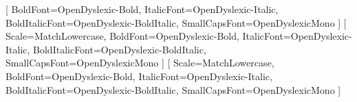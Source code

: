 \usepackage[french]{babel}
\usepackage[utf8x]{inputenc} %
\usepackage{xspace} %

\usepackage{ifxetex}
\ifxetex
    \usepackage{fontspec}
    \setmainfont{OpenDyslexic}
    [
      BoldFont=OpenDyslexic-Bold,
      ItalicFont=OpenDyslexic-Italic,
      BoldItalicFont=OpenDyslexic-BoldItalic,
      SmallCapsFont=OpenDyslexicMono
    ]
    \setsansfont{OpenDyslexic}[
      Scale=MatchLowercase,
      BoldFont=OpenDyslexic-Bold,
      ItalicFont=OpenDyslexic-Italic,
      BoldItalicFont=OpenDyslexic-BoldItalic,
      SmallCapsFont=OpenDyslexicMono
    ]
    \setmonofont{OpenDyslexicMono}[
      Scale=MatchLowercase,
      BoldFont=OpenDyslexic-Bold,
      ItalicFont=OpenDyslexic-Italic,
      BoldItalicFont=OpenDyslexic-BoldItalic,
      SmallCapsFont=OpenDyslexicMono
    ]
\else
    \usepackage[T1]{fontenc}
\fi

\usepackage{amsmath, amsfonts} %
\usepackage{latexsym}

\usepackage{amsthm}

\usepackage{authoraftertitle}

\usepackage{datetime}

\usepackage{hyperref}
\usepackage{bookmark}

\usepackage{graphicx}
\usepackage{subcaption} %

\usepackage{tabularx}
\usepackage{multirow} %
\usepackage{multicol} %
\usepackage[table]{xcolor}
\usepackage{longtable} %
\usepackage{array} %

\usepackage{float} %

\usepackage{xcolor}






\usepackage{magictex}
